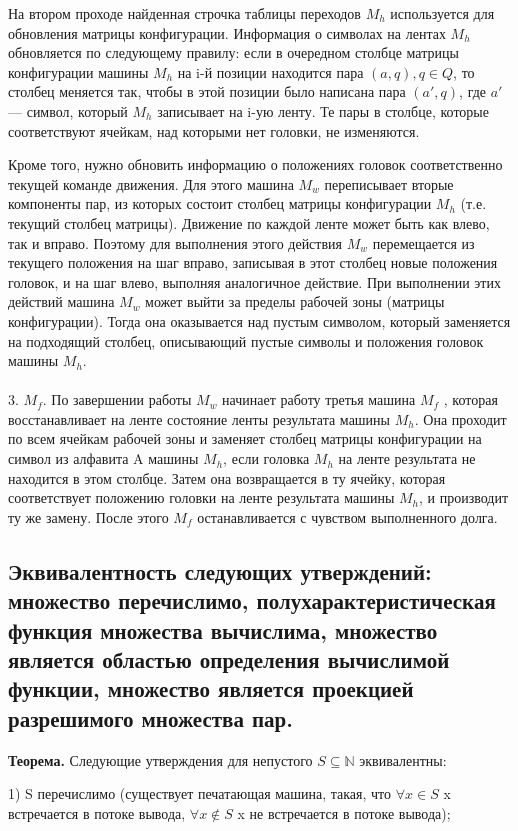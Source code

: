 На втором проходе найденная строчка таблицы переходов $M_h$ используется для обновления
матрицы конфигурации. Информация о символах на лентах $M_h$ обновляется по следующему
правилу: если в очередном столбце матрицы конфигурации машины $M_h$ на i-й позиции находится пара $(a, q), q \in Q$, то столбец меняется так, чтобы в этой позиции было написана пара
$(a', q)$, где $a'$ — символ, который $M_h$ записывает на i-ую ленту. Те пары в столбце, которые
соответствуют ячейкам, над которыми нет головки, не изменяются.


Кроме того, нужно обновить информацию о положениях головок соответственно текущей
команде движения. Для этого машина $M_w$ переписывает вторые компоненты пар, из которых
состоит столбец матрицы конфигурации $M_h$ (т.е. текущий столбец матрицы). Движение по
каждой ленте может быть как влево, так и вправо. Поэтому для выполнения этого действия
$M_w$ перемещается из текущего положения на шаг вправо, записывая в этот столбец новые
положения головок, и на шаг влево, выполняя аналогичное действие. При выполнении этих
действий машина $M_w$ может выйти за пределы рабочей зоны (матрицы конфигурации). Тогда
она оказывается над пустым символом, который заменяется на подходящий столбец, описывающий пустые символы и положения головок машины $M_h$.
\\
\\
3. $M_f$. По завершении работы $M_w$ начинает работу третья машина $M_f$ , которая восстанавливает на ленте состояние ленты результата машины $M_h$. Она проходит по всем ячейкам рабочей зоны и
заменяет столбец матрицы конфигурации на символ из алфавита A машины $M_h$, если головка
$M_h$ на ленте результата не находится в этом столбце. Затем она возвращается в ту ячейку,
которая соответствует положению головки на ленте результата машины $M_h$, и производит ту
же замену. После этого $M_f$ останавливается с чувством выполненного долга.

\subsection{Эквивалентность следующих утверждений: множество перечислимо, полухарактеристическая функция множества вычислима, множество является областью определения вычислимой функции, множество является проекцией разрешимого множества пар.}

\textbf{Теорема.} Следующие утверждения для непустого $S \subseteq \mathbb{N}$ эквивалентны:

1) S перечислимо (существует печатающая машина, такая, что $\forall x \in S$ x встречается в потоке вывода, $\forall x \notin S$ x не встречается в потоке вывода);

